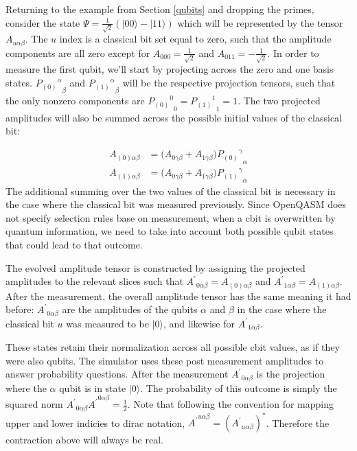 \documentclass[%
 reprint,
 amsmath,amssymb,
 aps,
]{revtex4-2}
\begin{document}
Returning to the example from Section \ref{qubits} and dropping the primes, consider the state $\Psi = \frac{1}{\sqrt{2}} (|00\rangle - |11\rangle)$ which will be represented by the tensor $A_{u \alpha\beta }$. The $u$ index is a classical bit set equal to zero, such that the amplitude components are all zero except for $A_{000} = \frac{1}{\sqrt{2}}$ and $A_{011} = -\frac{1}{\sqrt{2}}$. In order to measure the first qubit, we'll start by projecting across the zero and one basis states. ${{P_{(0)}}^{\alpha}}_{\beta}$ and ${{P_{(1)}}^{\alpha}}_{\beta}$ will be the respective projection tensors, such that the only nonzero components are ${{P_{(0)}}^{0}}_0 = {{P_{(1)}}^{1}}_1 = 1$.  The two projected amplitudes will also be summed across the possible initial values of the classical bit:

\begin{align*} 
A_{(0)\alpha\beta}  &= \big(A_{0 \gamma\beta} + A_{1 \gamma\beta}\big) {{P_{(0)}}^{\gamma}}_{\alpha} \\
A_{(1)\alpha\beta}  &= \big(A_{0 \gamma\beta} + A_{1 \gamma\beta}\big) {{P_{(1)}}^{\gamma}}_{\alpha}
\end{align*}
The additional summing over the two values of the classical bit is necessary in the case where the classical bit was measured previously. Since OpenQASM does not specify selection rules base on measurement, when a cbit is overwritten by quantum information, we need to take into account both possible qubit states that could lead to that outcome. 

The evolved amplitude tensor is constructed by assigning the projected amplitudes to the relevant slices such that ${A^\prime}_{0\alpha\beta} = A_{(0)\alpha\beta}$ and ${A^\prime}_{1\alpha\beta} = A_{(1)\alpha\beta}$. After the measurement, the overall amplitude tensor has the same meaning it had before: ${A^\prime}_{0 \alpha\beta}$ are the amplitudes of the qubits $\alpha$ and $\beta$ in the case where the classical bit $u$ was measured to be $|0\rangle$, and likewise for ${A^\prime}_{1 \alpha\beta}$.

These states retain their normalization across all possible cbit values, as if they were also qubits. The simulator uses these post measurement amplitudes to answer probability questions. After the measurement ${A^\prime}_{0 \alpha\beta}$ is the projection where the $\alpha$ qubit is in state $|0\rangle$. The probability of this outcome is simply the squared norm ${A^\prime}_{0 \alpha\beta}{A^\prime}^{0 \alpha\beta} = \frac{1}{2}$. Note that following the convention for mapping upper and lower indicies to dirac notation, ${A^\prime}^{u \alpha\beta}  = ({A^\prime}_{u \alpha\beta})^{\ast}$. Therefore the contraction above will always be real. 
\end{document}
